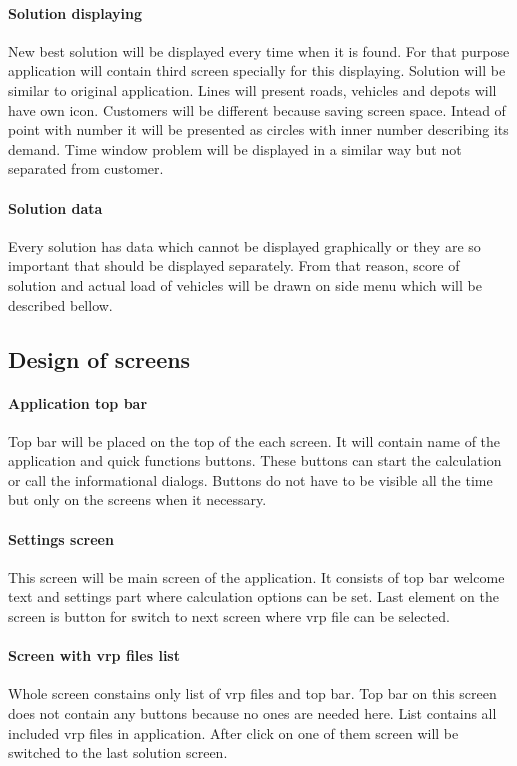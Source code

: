 \paragraph{Solution displaying}
New best solution will be displayed every time when it is found. For that purpose application will contain third screen
specially for this displaying. Solution will be similar to original application. Lines will present roads, vehicles and
depots will have own icon. Customers will be different because saving screen space. Intead of point with number it will
be presented as circles with inner number describing its demand. Time window problem will be displayed in a similar way
but not separated from customer.

\paragraph{Solution data}
Every solution has data which cannot be displayed graphically or they are so important that should be displayed
separately. From that reason, score of solution and actual load of vehicles will be drawn on side menu which will be
described bellow.

\subsection{Design of screens}

\paragraph{Application top bar}
Top bar will be placed on the top of the each screen. It will contain name of the application and quick functions
buttons. These buttons can start the calculation or call the informational dialogs. Buttons do not have to be visible
all the time but only on the screens when it necessary.

\paragraph{Settings screen}
This screen will be main screen of the application. It consists of top bar welcome text and settings part where
calculation options can be set. Last element on the screen is button for switch to next screen where vrp file can be
selected.

\paragraph{Screen with vrp files list}
Whole screen constains only list of vrp files and top bar. Top bar on this screen does not contain any buttons because
no ones are needed here. List contains all included vrp files in application. After click on one of them screen will be
switched to the last solution screen.

